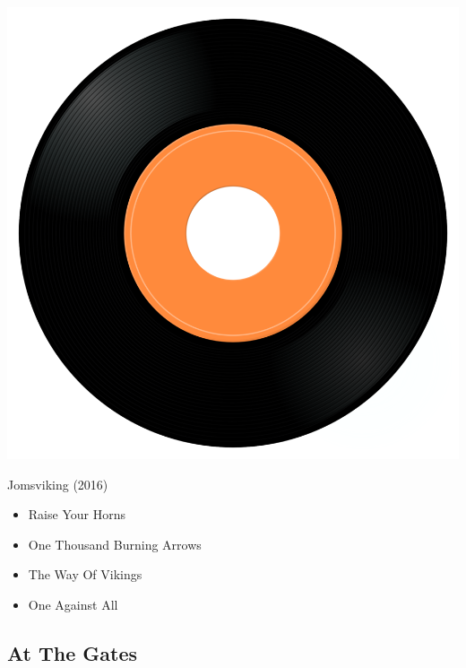 \begin{minipage}[t]{0.25\textwidth}\vspace{0pt}
\captionsetup{type=figure}
\includegraphics[width=\textwidth]{Images/cover.png}
\caption*{Jomsviking (2016)}
\end{minipage}
\begin{minipage}[t]{0.25\textwidth}\vspace{0pt}
\begin{itemize}[nosep,leftmargin=1em,labelwidth=*,align=left]
	\setlength{\itemsep}{0pt}
	\item Raise Your Horns
	\item One Thousand Burning Arrows
	\item The Way Of Vikings
	\item One Against All
\end{itemize}
\end{minipage}

\subsection{At The Gates}


